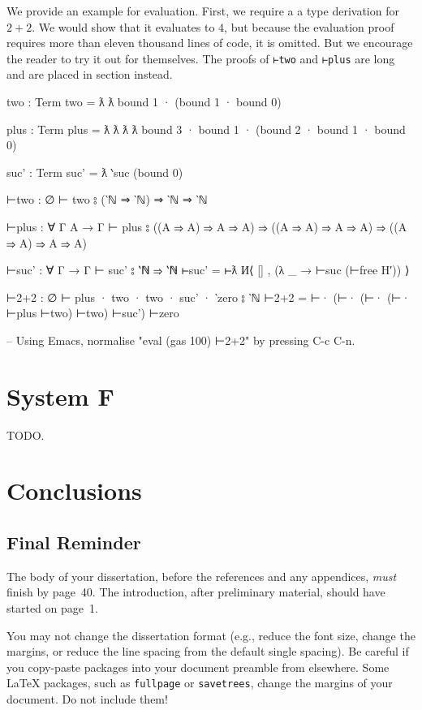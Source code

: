 \documentclass[logo,bsc,singlespacing,parskip,online]{infthesis}
\renewenvironment{code}{\mintedcopy[breaklines,breaksymbolleft=\;]{agda}}{\endmintedcopy}
\begin{document}
We provide an example for evaluation. First, we require a a type derivation for $2+2$. We would show
that it evaluates to $4$, but because the evaluation proof requires more than eleven thousand lines
of code, it is omitted. But we encourage the reader to try it out for themselves. The proofs of
\texttt{⊢two} and \texttt{⊢plus} are long and are placed in section instead.

\begin{code}
two : Term
two = ƛ ƛ bound 1 · (bound 1 · bound 0)

plus : Term
plus = ƛ ƛ ƛ ƛ bound 3 · bound 1 · (bound 2 · bound 1 · bound 0)

suc' : Term
suc' = ƛ ‵suc (bound 0)

⊢two : ∅ ⊢ two ⦂ (‵ℕ ⇒ ‵ℕ) ⇒ ‵ℕ ⇒ ‵ℕ

⊢plus : ∀ {Γ A} → Γ ⊢ plus ⦂
  ((A ⇒ A) ⇒ A ⇒ A) ⇒ ((A ⇒ A) ⇒ A ⇒ A) ⇒ ((A ⇒ A) ⇒ A ⇒ A)

⊢suc' : ∀ {Γ} → Γ ⊢ suc' ⦂ ‵ℕ ⇒ ‵ℕ
⊢suc' = ⊢ƛ И⟨ [] , (λ _ → ⊢suc (⊢free H′)) ⟩

⊢2+2 : ∅ ⊢ plus · two · two · suc' · ‵zero ⦂ ‵ℕ
⊢2+2 = ⊢· (⊢· (⊢· (⊢· ⊢plus  ⊢two) ⊢two) ⊢suc') ⊢zero

-- Using Emacs, normalise "eval (gas 100) ⊢2+2" by pressing C-c C-n.
\end{code}

\chapter{System F}
TODO.

\chapter{Conclusions}

\section{Final Reminder}

The body of your dissertation, before the references and any appendices,
\emph{must} finish by page~40. The introduction, after preliminary material,
should have started on page~1.

You may not change the dissertation format (e.g., reduce the font size, change
the margins, or reduce the line spacing from the default single spacing). Be
careful if you copy-paste packages into your document preamble from elsewhere.
Some \LaTeX{} packages, such as \texttt{fullpage} or \texttt{savetrees}, change
the margins of your document. Do not include them!
\end{document}
